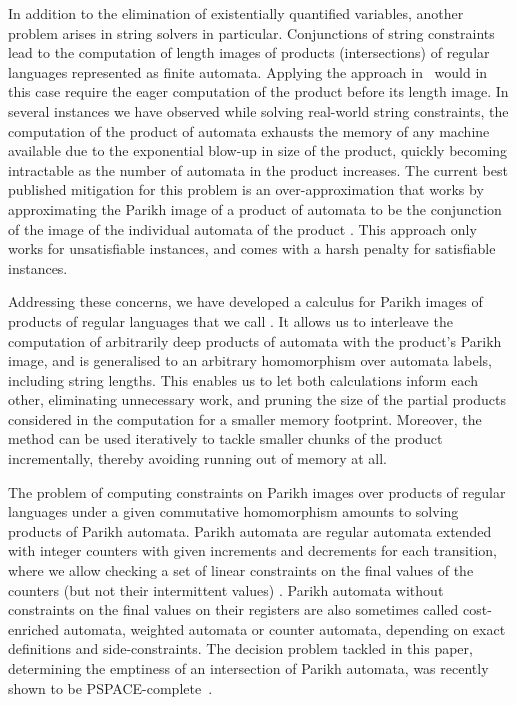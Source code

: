 \documentclass[acmsmall,review,anonymous,screen]{acmart}\settopmatter{printfolios=true,printccs=false,printacmref=true}
\theoremstyle{definition}
\begin{document}
In addition to the elimination of existentially quantified variables, another
problem arises in string solvers in particular. Conjunctions of string
constraints lead to the computation of length images of products (intersections)
of regular languages represented as finite automata. Applying the approach
in~\cite{generate-parikh-image} would in this case require the eager computation
of the product before its length image. In several instances we have observed
while solving real-world string constraints, the computation of the product of
automata exhausts the memory of any machine available due to the exponential
blow-up in size of the product, quickly becoming intractable as the number of
automata in the product increases. The current best published mitigation for
this problem is an over-approximation that works by approximating the Parikh
image of a product of automata to be the conjunction of the image of the
individual automata of the product \cite{approximate-parikh}. This approach only
works for unsatisfiable instances, and comes with a harsh penalty for
satisfiable instances.

Addressing these concerns, we have developed a calculus for Parikh images of
products of regular languages that we call \Calculus{}. It allows us to
interleave the computation of arbitrarily deep products of automata with the
product's Parikh image, and is generalised to an arbitrary homomorphism over
automata labels, including string lengths. This enables us to let both
calculations inform each other, eliminating unnecessary work, and pruning the
size of the partial products considered in the computation for a smaller memory
footprint. Moreover, the method can be used iteratively to tackle smaller chunks
of the product incrementally, thereby avoiding running out of memory at all.

The problem of computing constraints on Parikh images over products of regular
languages under a given commutative homomorphism amounts to solving products of
Parikh automata. Parikh automata are regular automata extended with integer
counters with given increments and decrements for each transition, where we
allow checking a set of linear constraints on the final values of the counters
(but not their intermittent values) \cite{parikh-automata}. Parikh automata
without constraints on the final values on their registers are also sometimes
called cost-enriched automata, weighted automata or counter automata, depending
on exact definitions and side-constraints. The decision problem tackled in this
paper, determining the emptiness of an intersection of Parikh automata, was
recently shown to be PSPACE-complete~\cite{graph-queries}.
\end{document}

